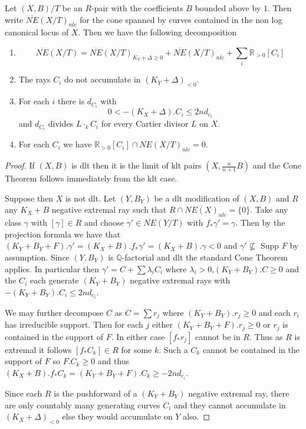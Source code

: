 \documentclass[a4paper,12pt]{book}
\begin{document}
	\begin{theorem}\label{WCT}
	Let $(X,B)/T$ be an $R$-pair with the coefficients $B$ bounded above by $1$. Then write $\overline{NE}(X/T)_{nlc}$ for the cone spanned by curves contained in the non log canonical locus of $X$. Then we have the following decomposition
	
		\begin{enumerate}
		\item $$\overline{NE}(X/T)=\overline{NE}(X/T)_{K_{Y}+\Delta \geq 0} +\overline{NE}(X/T)_{nlc}+ \sum_{i} \mathbb{R}_{>0}[C_{i}]$$
		\item The rays $C_{i}$ do not accumulate in $(K_{Y}+\Delta)_{<0}$.
		\item For each $i$ there is $d_{C_{i}}$ with 
		\[0 < -(K_{X}+\Delta).C_{i} \leq 2nd_{c_{i}}\]
		and $d_{C_{i}}$ divides $L\cdot_{k}C_{i}$ for every Cartier divisor $L$ on $X$.
		\item For each $C_{i}$ we have $\mathbb{R}_{>0}[C_{i}] \cap \overline{NE}(X/T)_{nlc} = {0}$.
	\end{enumerate}

	
\end{theorem}
\begin{proof}
	If $(X,B)$ is dlt then it is the limit of klt pairs $(X,\frac{n}{n+1}B)$ and the Cone Theorem follows immediately from the klt case.
	
	Suppose then $X$ is not dlt.
	Let $(Y,B_{Y})$ be a dlt modification of $(X,B)$ and $R$ any $K_{X}+B$ negative extremal ray such that $R \cap\overline{NE(X)}_{nlc}=\{0\}$. Take any class $\gamma$ with $[\gamma] \in R$ and choose $\gamma' \in \overline{NE}(Y/T)$ with $f_{*}\gamma'=\gamma$. Then by the projection formula we have that $(K_{Y}+B_{Y}+F).\gamma'=(K_{X}+B).f_{*}\gamma'=(K_{X}+B).\gamma < 0$ and $\gamma' \not\subseteq$ Supp $F$ by assumption. 
	Since $(Y,B_{Y})$ is $\mathbb{Q}$-factorial and dlt the standard Cone Theorem applies. In particular then $\gamma'=C+ \sum \lambda_{i}C_{i}$ where $\lambda_{i} >0$,$(K_{Y}+B_{Y}).C \geq 0$ and the $C_{i}$ each generate $(K_{Y}+B_{Y})$ negative extremal rays with $-(K_{Y}+B_{Y}).C_{i} \leq 2nd_{c_{i}}$. 
	
	We may further decompose $C$ as $C=\sum r_{j}$ where $(K_{Y}+B_{Y}).r_{j} \geq 0$ and each $r_{i}$ has irreducible support. Then for each $j$ either $(K_{Y}+B_{Y}+F).r_{j} \geq 0$ or $r_{j}$ is contained in the support of $F$. In either case $[f_{*}r_{j}]$ cannot be in $R$. Thus as $R$ is extremal it follows $[f_{*}C_{k}] \in R$ for some $k$. Such a $C_{k}$ cannot be contained in the support of $F$ so $F.C_{k} \geq 0$ and thus $(K_{X}+B).f_{*}C_{k}=(K_{Y}+B_{Y}+F).C_{k} \geq -2nd_{c_{i}}$.
	
	Since each $R$ is the pushforward of a $(K_{Y}+B_{Y})$ negative extremal ray, there are only countably many generating curves $C_{i}$ and they cannot accumulate in $(K_{X}+\Delta)_{< 0}$ else they would accumulate on $Y$ also.
\end{proof}
\end{document}
